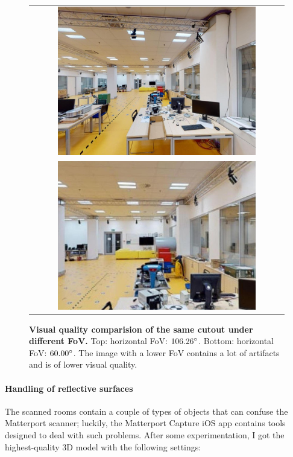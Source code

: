\documentclass[twoside]{ctuthesis}
\theoremstyle{plain}
\theoremstyle{definition}
\theoremstyle{note}
\begin{document}
\begin{figure}
    \centering
    {
    \begin{tabular}{c}
    \includegraphics[width=0.8\textwidth]{cutout_19_-90_0_FoV106} \\
    \includegraphics[width=0.8\textwidth]{cutout_19_-90_0_FoV60}
    \end{tabular}
	\caption{{\bf Visual quality comparision of the same cutout under different FoV.} Top: horizontal FoV: $106.26\degree$. Bottom: horizontal FoV: $60.00\degree$. The image with a lower FoV contains a lot of artifacts and is of lower visual quality.}
	\label{fig:fov-quality}
    }
\end{figure}

\paragraph{Handling of reflective surfaces}
The scanned rooms contain a couple of types of objects that can confuse the Matterport scanner; luckily, the Matterport Capture iOS app contains tools designed to deal with such problems. After some experimentation, I got the highest-quality 3D model with the following settings:
\end{document}
